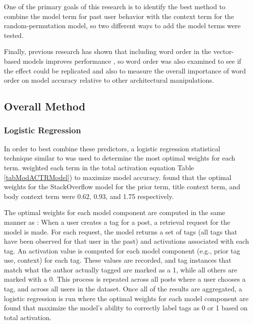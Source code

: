 \documentclass[man,floatsintext,donotrepeattitle]{apa6}
\begin{document}
One of the primary goals of this research is to identify the best method to combine the model term for past user behavior with the context term for the random-permutation model,
so two different ways to add the model terms were tested.

Finally, previous research has shown that including word order in the vector-based models improves performance \parencites{Jones2007, Sahlgren2008},
so word order was also examined to see if the effect could be replicated and also to measure the overall importance of word order on model accuracy relative to other architectural manipulations.

\subsection{Overall Method}

\subsubsection{Logistic Regression}

In order to best combine these predictors, a logistic regression statistical technique similar to \textcite{Stanley2013} was used to determine the most optimal weights for each term.
\textcite{Stanley2013} weighted each term in the total activation equation Table \ref{tabModACTRModel}) to maximize model accuracy.
 found that the optimal weights for the StackOverflow model for the prior term, title context term, and body context term were \num{.62}, \num{.93}, and \num{1.75} respectively.

The optimal weights for each model component are computed in the same manner as \textcite{Stanley2013}:
When a user creates a tag for a post, a retrieval request for the model is made.
For each request, the model returns a set of tags (all tags that have been observed for that user in the past) and activations associated with each tag.
An activation value is computed for each model component (e.g., prior tag use, context) for each tag.
These values are recorded, and tag instances that match what the author actually tagged are marked as a 1, while all others are marked with a 0.
This process is repeated across all posts where a user chooses a tag, and across all users in the dataset.
Once all of the results are aggregated, a logistic regression is run where the optimal weights for each model component are found that maximize the model's ability to correctly label tags as 0 or 1 based on total activation.
\end{document}

